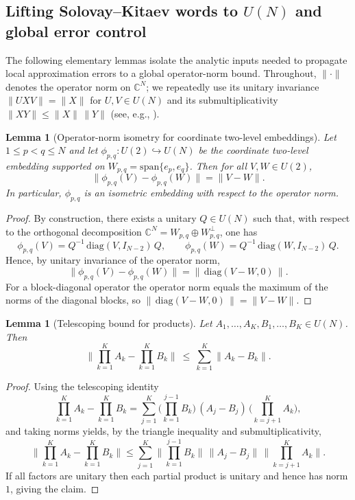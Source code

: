 \documentclass{article}%
\newtheorem{lemma}[theorem]{Lemma}
\theoremstyle{definition}
\numberwithin{equation}{section}
\begin{document}
\subsection{Lifting Solovay--Kitaev words to $U(N)$ and global error control}
\label{subsec:lifting_and_error}

The following elementary lemmas isolate the analytic inputs needed to propagate local approximation errors
to a global operator-norm bound. Throughout, $\|\cdot\|$ denotes the operator norm on $\mathbb{C}^N$; we repeatedly use its unitary
invariance $\|UXV\|=\|X\|$ for $U,V\in U(N)$ and its submultiplicativity $\|XY\|\le \|X\|\,\|Y\|$ (see, e.g., \cite{HornJohnson2013}).

\begin{lemma}[Operator-norm isometry for coordinate two-level embeddings]
\label{lem:two_level_isometry}
Let $1\le p<q\le N$ and let $\phi_{p,q}:U(2)\hookrightarrow U(N)$ be the coordinate two-level embedding supported on
$W_{p,q}=\mathrm{span}\{e_p,e_q\}$. Then for all $V,W\in U(2)$,
\[
\big\|\phi_{p,q}(V)-\phi_{p,q}(W)\big\|=\|V-W\|.
\]
In particular, $\phi_{p,q}$ is an isometric embedding with respect to the operator norm.
\end{lemma}

\begin{proof}
By construction, there exists a unitary $Q\in U(N)$ such that, with respect to the orthogonal decomposition
$\mathbb{C}^N=W_{p,q}\oplus W_{p,q}^\perp$, one has
\[
\phi_{p,q}(V)=Q^{-1}\,\mathrm{diag}(V,I_{N-2})\,Q,
\qquad
\phi_{p,q}(W)=Q^{-1}\,\mathrm{diag}(W,I_{N-2})\,Q.
\]
Hence, by unitary invariance of the operator norm,
\[
\|\phi_{p,q}(V)-\phi_{p,q}(W)\|
=
\big\|\,\mathrm{diag}(V-W,0)\,\big\|.
\]
For a block-diagonal operator the operator norm equals the maximum of the norms of the diagonal blocks, so
$\big\|\,\mathrm{diag}(V-W,0)\,\big\|=\|V-W\|$.
\end{proof}

\begin{lemma}[Telescoping bound for products]
\label{lem:error_accumulation}
Let $A_1,\dots,A_K,B_1,\dots,B_K\in U(N)$. Then
\[
\Big\|\prod_{k=1}^K A_k-\prod_{k=1}^K B_k\Big\|
\ \le\
\sum_{k=1}^K \|A_k-B_k\|.
\]
\end{lemma}

\begin{proof}
Using the telescoping identity
\[
\prod_{k=1}^K A_k-\prod_{k=1}^K B_k
=
\sum_{j=1}^K
\Big(\prod_{k=1}^{j-1} B_k\Big)\,(A_j-B_j)\,\Big(\prod_{k=j+1}^{K} A_k\Big),
\]
and taking norms yields, by the triangle inequality and submultiplicativity,
\[
\Big\|\prod_{k=1}^K A_k-\prod_{k=1}^K B_k\Big\|
\le
\sum_{j=1}^K
\Big\|\prod_{k=1}^{j-1} B_k\Big\|\,\|A_j-B_j\|\,\Big\|\prod_{k=j+1}^{K} A_k\Big\|.
\]
If all factors are unitary then each partial product is unitary and hence has norm $1$, giving the claim.
\end{proof}
\end{document}
